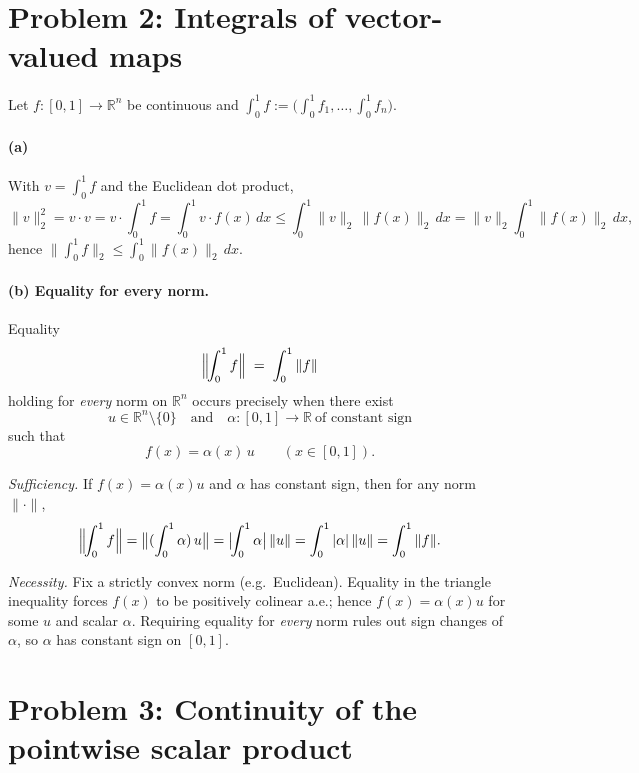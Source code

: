 \documentclass[12pt,a4paper]{article}
\theoremstyle{plain}
\theoremstyle{definition}
\theoremstyle{remark}
\theoremstyle{remark}
\begin{document}
	\bigskip
	\section*{Problem 2: Integrals of vector-valued maps}
	
	
	
	Let $f:[0,1]\to\mathbb R^n$ be continuous and $\displaystyle \int_0^1 f:=\big(\int_0^1 f_1,\dots,\int_0^1 f_n\big)$.
	
	\paragraph{(a)}
	With $v=\int_0^1 f$ and the Euclidean dot product,
	\[
	\|v\|_2^2=v\cdot v=v\cdot \int_0^1 f=\int_0^1 v\cdot f(x)\,dx
	\le \int_0^1 \|v\|_2\,\|f(x)\|_2\,dx
	=\|v\|_2\int_0^1 \|f(x)\|_2\,dx,
	\]
	hence $\Big\|\int_0^1 f\Big\|_2 \le \int_0^1 \|f(x)\|_2\,dx$.
	
\paragraph{(b) Equality for every norm.}
Equality
\[
\Bigl\|\!\int_{0}^{1} f \Bigr\| \;=\; \int_{0}^{1} \|f\|
\]
holding for \emph{every} norm on $\mathbb{R}^n$ occurs precisely when there exist
\[
u\in\mathbb{R}^n\setminus\{0\}
\quad\text{and}\quad
\alpha:[0,1]\to\mathbb{R}\ \text{of constant sign}
\]
such that
\[
f(x)=\alpha(x)\,u \qquad (x\in[0,1]).
\]

\noindent\textit{Sufficiency.}
If $f(x)=\alpha(x)u$ and $\alpha$ has constant sign, then for any norm $\|\cdot\|$,
\[
\Bigl\|\!\int_{0}^{1} f \Bigr\|
=\bigl\| (\int_{0}^{1}\alpha)\,u \bigr\|
= \bigl|\!\int_{0}^{1}\alpha \bigr|\,\|u\|
= \int_{0}^{1} |\alpha|\,\|u\|
= \int_{0}^{1} \|f\|.
\]

\noindent\textit{Necessity.}
Fix a strictly convex norm (e.g.\ Euclidean). Equality in the triangle inequality forces
$f(x)$ to be positively colinear a.e.; hence $f(x)=\alpha(x)u$ for some $u$ and scalar $\alpha$.
Requiring equality for \emph{every} norm rules out sign changes of $\alpha$, so $\alpha$ has
constant sign on $[0,1]$.
\medskip

\section*{Problem 3: Continuity of the pointwise scalar product}
\end{document}
